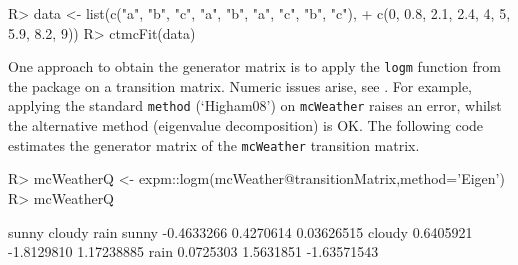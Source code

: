 \documentclass[
  nojss]{jss}
\begin{document}
\begin{CodeChunk}
\begin{CodeInput}
R> data <- list(c("a", "b", "c", "a", "b", "a", "c", "b", "c"), 
+              c(0, 0.8, 2.1, 2.4, 4, 5, 5.9, 8.2, 9))
R> ctmcFit(data)
\end{CodeInput}
\end{CodeChunk}

One approach to obtain the generator matrix is to apply the \texttt{logm} function from the  package on a transition matrix. Numeric issues arise, see \cite{israel2001finding}. For example, applying the standard \texttt{method} (`Higham08') on \texttt{mcWeather} raises an error, whilst the alternative method (eigenvalue decomposition) is OK. The following code estimates the generator matrix of the \texttt{mcWeather} transition matrix.

\begin{CodeChunk}
\begin{CodeInput}
R> mcWeatherQ <- expm::logm(mcWeather@transitionMatrix,method='Eigen')
R> mcWeatherQ
\end{CodeInput}
\begin{CodeOutput}
            sunny     cloudy        rain
sunny  -0.4633266  0.4270614  0.03626515
cloudy  0.6405921 -1.8129810  1.17238885
rain    0.0725303  1.5631851 -1.63571543
\end{CodeOutput}
\end{CodeChunk}
\end{document}
